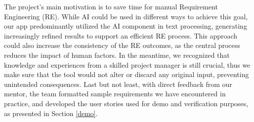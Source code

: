 The project's main motivation is to save time for manual Requirement Engineering (RE). While AI could be used in different ways to achieve this goal, our app predominantly utilized the AI component in text processing, generating increasingly refined results to support an efficient RE process. This approach could also increase the consistency of the RE outcomes, as the central process reduces the impact of human factors. In the meantime, we recognized that knowledge and experiences from a skilled project manager is still crucial, thus we make sure that the tool would not alter or discard any original input, preventing unintended consequences. Last but not least, with direct feedback from our mentor, the team formatted sample requirements we have encountered in practice, and developed the user stories used for demo and verification purposes, as presented in Section \ref{demo}.